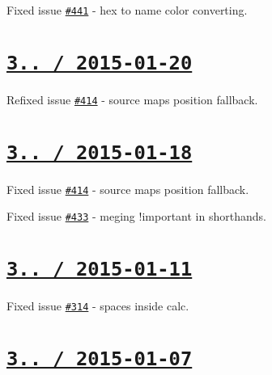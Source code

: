 \begin{DoxyItemize}
\item Fixed issue \href{https://github.com/jakubpawlowicz/clean-css/issues/441}{\tt \#441} -\/ hex to name color converting.
\end{DoxyItemize}

\section*{\href{https://github.com/jakubpawlowicz/clean-css/compare/v3.0.5...v3.0.6}{\tt 3.. / 2015-\/01-\/20} }


\begin{DoxyItemize}
\item Refixed issue \href{https://github.com/jakubpawlowicz/clean-css/issues/414}{\tt \#414} -\/ source maps position fallback.
\end{DoxyItemize}

\section*{\href{https://github.com/jakubpawlowicz/clean-css/compare/v3.0.4...v3.0.5}{\tt 3.. / 2015-\/01-\/18} }


\begin{DoxyItemize}
\item Fixed issue \href{https://github.com/jakubpawlowicz/clean-css/issues/414}{\tt \#414} -\/ source maps position fallback.
\item Fixed issue \href{https://github.com/jakubpawlowicz/clean-css/issues/433}{\tt \#433} -\/ meging {\ttfamily !important} in shorthands.
\end{DoxyItemize}

\section*{\href{https://github.com/jakubpawlowicz/clean-css/compare/v3.0.3...v3.0.4}{\tt 3.. / 2015-\/01-\/11} }


\begin{DoxyItemize}
\item Fixed issue \href{https://github.com/jakubpawlowicz/clean-css/issues/314}{\tt \#314} -\/ spaces inside {\ttfamily calc}.
\end{DoxyItemize}

\section*{\href{https://github.com/jakubpawlowicz/clean-css/compare/v3.0.2...v3.0.3}{\tt 3.. / 2015-\/01-\/07} }


